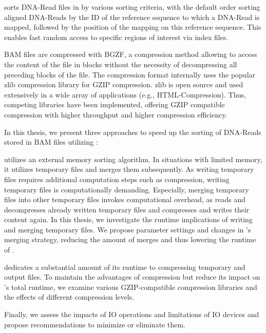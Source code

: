 \sort sorts DNA-Read files in by various sorting criteria, with the default order sorting aligned DNA-Reads by the ID of the reference sequence to which a DNA-Read is mapped, followed by the position of the mapping on this reference sequence. This enables fast random access to specific regions of interest via index files. 

BAM files are compressed with BGZF, a compression method allowing to access the content of the file in blocks without the necessity of decompressing all preceding blocks of the file. The compression format internally uses the popular zlib compression library for GZIP compression. zlib is open source and used extensively in a wide array of applications (e.g., HTML-Compression). Thus, competing libraries have been implemented, offering GZIP compatible compression with higher throughput and higher compression efficiency. 

In this thesis, we present three approaches to speed up the sorting of DNA-Reads stored in BAM files utilizing \sort: 

\sort utilizes an external memory sorting algorithm. In situations with limited memory, it utilizes temporary files and merges them subsequently. As writing temporary files requires additional computation steps such as compression, writing temporary files is computationally demanding. Especially, merging temporary files into other temporary files invokes computational overhead, as \sort reads and decompresses already written temporary files and compresses and writes their content again. In this thesis, we investigate the runtime implications of \sort writing and merging temporary files. We propose parameter settings and changes in \sort's merging strategy, reducing the amount of merges and thus lowering the runtime of \sort. 

\sort dedicates a substantial amount of its runtime to compressing temporary and output files. To maintain the advantages of compression but reduce its impact on \sort's total runtime, we examine various GZIP-compatible compression libraries and the effects of different compression levels.

Finally, we assess the impacts of IO operations and limitations of IO devices and propose recommendations to minimize or eliminate them. 
